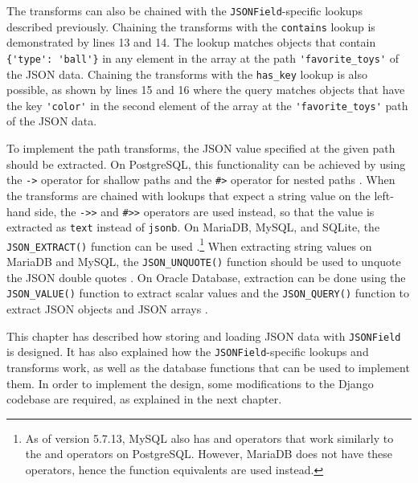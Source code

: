The transforms can also be chained with the \verb|JSONField|-specific lookups
described previously. Chaining the transforms with the \verb|contains| lookup
is demonstrated by lines 13 and 14. The lookup matches objects that contain
\verb|{'type': 'ball'}| in any element in the array at the path
\verb|'favorite_toys'| of the JSON data. Chaining the transforms with the
\verb|has_key| lookup is also possible, as shown by lines 15 and 16 where the
query matches objects that have the key \verb|'color'| in the second element of
the array at the \verb|'favorite_toys'| path of the JSON data.

To implement the path transforms, the JSON value specified at the given path
should be extracted. On PostgreSQL, this functionality can be achieved by using
the \verb|->| operator for shallow paths and the \verb|#>| operator for nested
paths \cite{postgres:json_operators}. When the transforms are chained with
lookups that expect a string value on the left-hand side, the \verb|->>| and
\verb|#>>| operators are used instead, so that the value is extracted as
\verb|text| instead of \verb|jsonb|. On MariaDB, MySQL, and SQLite, the
\verb|JSON_EXTRACT()| function can be used \cite{mariadb:json_extract,
mysql:json_search, sqlite:json1}.\footnote{As of version 5.7.13, MySQL also has
\code{->} and \code{->>} operators that work similarly to the \code{\#>} and
\code{\#>>} operators on PostgreSQL. However, MariaDB does not have these
operators, hence the function equivalents are used instead.} When extracting
string values on MariaDB and MySQL, the \verb|JSON_UNQUOTE()| function should be
used to unquote the JSON double quotes \cite{mariadb:json_unquote,
mysql:json_modify}. On Oracle Database, extraction can be done using the
\verb|JSON_VALUE()| function to extract scalar values and the
\verb|JSON_QUERY()| function to extract JSON objects and JSON arrays
\cite{oracle:json_value, oracle:json_query}.

This chapter has described how storing and loading JSON data with
\verb|JSONField| is designed. It has also explained how the
\verb|JSONField|-specific lookups and transforms work, as well as the database
functions that can be used to implement them. In order to implement the design,
some modifications to the Django codebase are required, as explained in the
next chapter.
